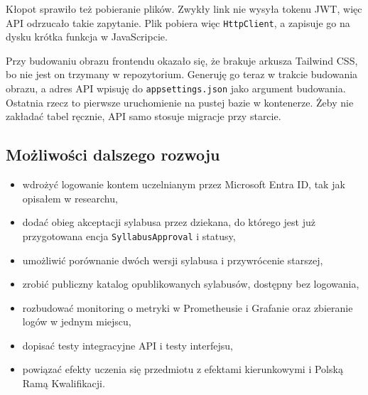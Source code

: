 \documentclass[times]{san}
\begin{document}
Kłopot sprawiło też pobieranie plików. Zwykły link nie wysyła tokenu JWT, więc API odrzucało takie zapytanie. Plik pobiera więc \texttt{HttpClient}, a zapisuje go na dysku krótka funkcja w JavaScripcie.

Przy budowaniu obrazu frontendu okazało się, że brakuje arkusza Tailwind CSS, bo nie jest on trzymany w repozytorium. Generuję go teraz w trakcie budowania obrazu, a adres API wpisuję do \texttt{appsettings.json} jako argument budowania. Ostatnia rzecz to pierwsze uruchomienie na pustej bazie w kontenerze. Żeby nie zakładać tabel ręcznie, API samo stosuje migracje przy starcie.

\subsection{Możliwości dalszego rozwoju}

\begin{itemize}
  \item wdrożyć logowanie kontem uczelnianym przez Microsoft Entra ID, tak jak opisałem w researchu,
  \item dodać obieg akceptacji sylabusa przez dziekana, do którego jest już przygotowana encja \texttt{SyllabusApproval} i statusy,
  \item umożliwić porównanie dwóch wersji sylabusa i przywrócenie starszej,
  \item zrobić publiczny katalog opublikowanych sylabusów, dostępny bez logowania,
  \item rozbudować monitoring o metryki w Prometheusie i Grafanie oraz zbieranie logów w jednym miejscu,
  \item dopisać testy integracyjne API i testy interfejsu,
  \item powiązać efekty uczenia się przedmiotu z efektami kierunkowymi i Polską Ramą Kwalifikacji.
\end{itemize}

\spistabel
\spisrysunkow
\clearpage
\lstlistoflistings
\printbibliography
\end{document}
